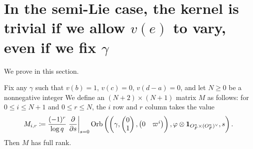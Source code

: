 \section{In the semi-Lie case, the kernel is trivial if we allow $v(e)$ to vary, even if we fix $\gamma$}
We prove  in this section.

\begin{lemma}
  Fix any $\gamma$ such that $v(b) = 1$, $v(c) = 0$, $v(d-a) = 0$,
  and let $N \ge 0$ be a nonnegative integer
  We define an $(N+2) \times (N+1)$ matrix $M$ as follows:
  for $0 \le i \le N+1$ and $0 \le r \le N$,
  the $i$ row and $r$ column takes the value
  \[
    M_{i,r} \coloneqq
    \frac{(-1)^r}{\log q}
    \left. \pdv{}{s} \right\rvert_{s=0}
      \operatorname{Orb}\left( \left(\gamma, \begin{pmatrix} 0 \\ 1 \end{pmatrix},
      \begin{pmatrix} 0 & \varpi^i \end{pmatrix} \right),
      \varphi \otimes \mathbf{1}_{O_F^n \times (O_F^n)^\vee}, s\right).
  \]
  Then $M$ has full rank.
\end{lemma}
